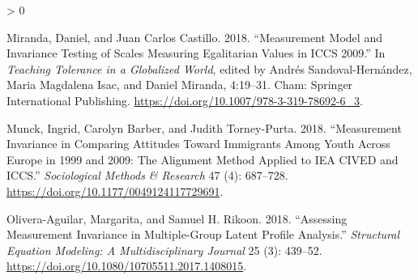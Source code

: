 \documentclass[
  11pt,
]{article}
\newlength{\cslhangindent}
\newenvironment{CSLReferences}[2] %
 {%
  \setlength{\parindent}{0pt}
  \ifodd #1 \everypar{\setlength{\hangindent}{\cslhangindent}}\ignorespaces\fi
  \ifnum #2 > 0
  \setlength{\parskip}{#2\baselineskip}
  \fi
 }%
 {}
\begin{document}
\begin{CSLReferences}{1}{0}
\leavevmode\hypertarget{ref-sandoval-hernandez_measurement_2018}{}%
Miranda, Daniel, and Juan Carlos Castillo. 2018. {``Measurement {Model}
and {Invariance} {Testing} of {Scales} {Measuring} {Egalitarian}
{Values} in {ICCS} 2009.''} In \emph{Teaching {Tolerance} in a
{Globalized} {World}}, edited by Andrés Sandoval-Hernández, Maria
Magdalena Isac, and Daniel Miranda, 4:19--31. Cham: Springer
International Publishing.
\url{https://doi.org/10.1007/978-3-319-78692-6_3}.

\leavevmode\hypertarget{ref-munck_measurement_2018}{}%
Munck, Ingrid, Carolyn Barber, and Judith Torney-Purta. 2018.
{``Measurement {Invariance} in {Comparing} {Attitudes} {Toward}
{Immigrants} {Among} {Youth} {Across} {Europe} in 1999 and 2009: {The}
{Alignment} {Method} {Applied} to {IEA} {CIVED} and {ICCS}.''}
\emph{Sociological Methods \& Research} 47 (4): 687--728.
\url{https://doi.org/10.1177/0049124117729691}.

\leavevmode\hypertarget{ref-olivera-aguilar_assessing_2018}{}%
Olivera-Aguilar, Margarita, and Samuel H. Rikoon. 2018. {``Assessing
{Measurement} {Invariance} in {Multiple}-{Group} {Latent} {Profile}
{Analysis}.''} \emph{Structural Equation Modeling: A Multidisciplinary
Journal} 25 (3): 439--52.
\url{https://doi.org/10.1080/10705511.2017.1408015}.

\end{CSLReferences}
\end{document}
